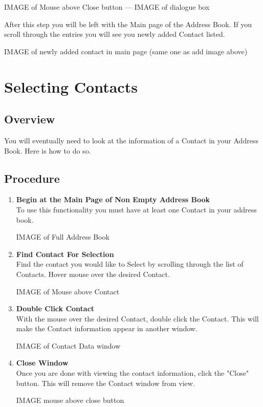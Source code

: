 \documentclass[a4paper, 11pt]{article}
\begin{document}
\begin{enumerate}[label=\textbf{\arabic*})]
    IMAGE of Mouse above Close button --- IMAGE of dialogue box
    
    After this step you will be left with the Main page of the Address Book. If you scroll through the entries you will see you newly added Contact listed.
    
    IMAGE of newly added contact in main page (same one as add image above)
   
\end{enumerate}


\section{Selecting Contacts}
\subsection{Overview}
You will eventually need to look at the information of a Contact in your Address Book. Here is how to do so.
\subsection{Procedure}
\begin{enumerate}[label=\textbf{\arabic*})]
    \item{\textbf{Begin at the Main Page of Non Empty Address Book}}\\ To use this functionality you must have at least one Contact in your address book.
    
    IMAGE of Full Address Book 
    
    \item{\textbf{Find Contact For Selection}}\\ Find the contact you would like to Select by scrolling through the list of Contacts. Hover mouse over the desired Contact. 
    
    IMAGE of Mouse above Contact
    
    \item{\textbf{Double Click Contact}}\\ With the mouse over the desired Contact, double click the Contact. This will make the Contact information appear in another window.
    
    IMAGE of Contact Data window
    
    \item{\textbf{Close Window}}\\ Once you are done with viewing the contact information, click the "Close" button. This will remove the Contact window from view.
    
    IMAGE mouse above close button 
\end{enumerate}
\end{document}
